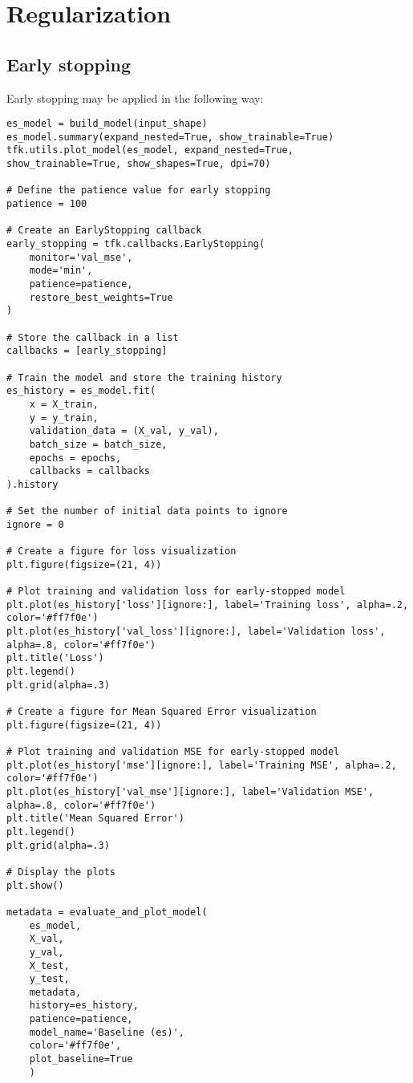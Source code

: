 \section{Regularization}

\subsection{Early stopping}
Early stopping may be applied in the following way: 
\begin{lstlisting}[style=Python]
es_model = build_model(input_shape)
es_model.summary(expand_nested=True, show_trainable=True)
tfk.utils.plot_model(es_model, expand_nested=True, show_trainable=True, show_shapes=True, dpi=70)

# Define the patience value for early stopping
patience = 100

# Create an EarlyStopping callback
early_stopping = tfk.callbacks.EarlyStopping(
    monitor='val_mse',
    mode='min',
    patience=patience,
    restore_best_weights=True
)

# Store the callback in a list
callbacks = [early_stopping]

# Train the model and store the training history
es_history = es_model.fit(
    x = X_train,
    y = y_train,
    validation_data = (X_val, y_val),
    batch_size = batch_size,
    epochs = epochs,
    callbacks = callbacks
).history

# Set the number of initial data points to ignore
ignore = 0

# Create a figure for loss visualization
plt.figure(figsize=(21, 4))

# Plot training and validation loss for early-stopped model
plt.plot(es_history['loss'][ignore:], label='Training loss', alpha=.2, color='#ff7f0e')
plt.plot(es_history['val_loss'][ignore:], label='Validation loss', alpha=.8, color='#ff7f0e')
plt.title('Loss')
plt.legend()
plt.grid(alpha=.3)

# Create a figure for Mean Squared Error visualization
plt.figure(figsize=(21, 4))

# Plot training and validation MSE for early-stopped model
plt.plot(es_history['mse'][ignore:], label='Training MSE', alpha=.2, color='#ff7f0e')
plt.plot(es_history['val_mse'][ignore:], label='Validation MSE', alpha=.8, color='#ff7f0e')
plt.title('Mean Squared Error')
plt.legend()
plt.grid(alpha=.3)

# Display the plots
plt.show()

metadata = evaluate_and_plot_model(
    es_model,
    X_val,
    y_val,
    X_test,
    y_test,
    metadata,
    history=es_history,
    patience=patience,
    model_name='Baseline (es)',
    color='#ff7f0e',
    plot_baseline=True
    )



\end{lstlisting}
